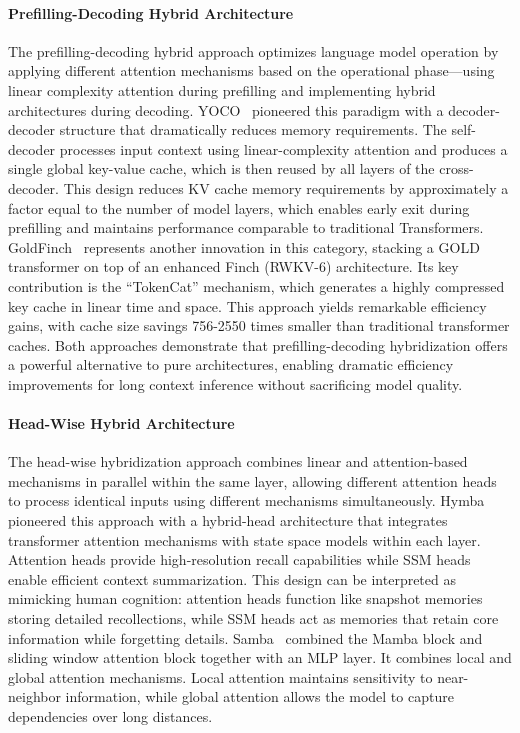 \documentclass[11pt, a4paper, logo, copyright, nonumbering]{map}
\begin{document}
\paragraph{Prefilling-Decoding Hybrid Architecture}

The prefilling-decoding hybrid approach optimizes language model operation by applying different attention mechanisms based on the operational phase—using linear complexity attention during prefilling and implementing hybrid architectures during decoding. YOCO~\cite{sun2025you} pioneered this paradigm with a decoder-decoder structure that dramatically reduces memory requirements. The self-decoder processes input context using linear-complexity attention and produces a single global key-value cache, which is then reused by all layers of the cross-decoder. This design reduces KV cache memory requirements by approximately a factor equal to the number of model layers, 
which enables early exit during prefilling and maintains performance comparable to traditional Transformers.
GoldFinch~\cite{goldstein2024goldfinch} represents another innovation in this category, stacking a GOLD transformer on top of an enhanced Finch (RWKV-6) architecture. Its key contribution is the ``TokenCat'' mechanism, which generates a highly compressed key cache
in linear time and space. This approach yields remarkable efficiency gains, with cache size savings 756-2550 times smaller than traditional transformer caches.
Both approaches demonstrate that prefilling-decoding hybridization offers a powerful alternative to pure architectures, enabling dramatic efficiency improvements for long context inference without sacrificing model quality.

\paragraph{Head-Wise Hybrid Architecture}
The head-wise hybridization approach combines linear and attention-based mechanisms in parallel within the same layer, allowing different attention heads to process identical inputs using different mechanisms simultaneously.
Hymba~\cite{dong2024hymba} pioneered this approach with a hybrid-head architecture that integrates transformer attention mechanisms with state space models within each layer. Attention heads provide high-resolution recall capabilities while SSM heads enable efficient context summarization. This design can be interpreted as mimicking human cognition: attention heads function like snapshot memories storing detailed recollections, while SSM heads act as memories that retain core information while forgetting details.
 Samba~\cite{ren2024sambasimplehybridstate} combined the Mamba block and sliding window attention block together with an MLP layer. It combines local and global attention mechanisms. Local attention maintains sensitivity to near-neighbor information, while global attention allows the model to capture dependencies over long distances.
\end{document}
